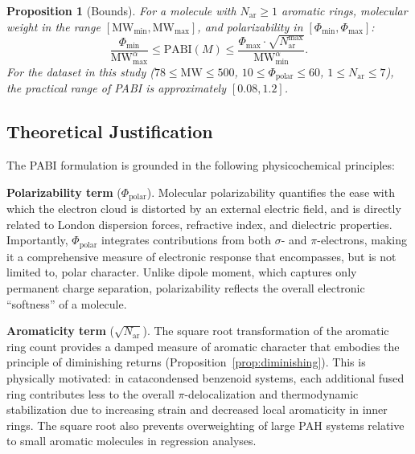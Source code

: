 \documentclass[12pt,a4paper]{article}
\newtheorem{proposition}{Proposition}
\begin{document}
\begin{proposition}[Bounds]
\label{prop:bounds}
For a molecule with $N_{\text{ar}} \geq 1$ aromatic rings, molecular weight in the range $[\text{MW}_{\min}, \text{MW}_{\max}]$, and polarizability in $[\Phi_{\min}, \Phi_{\max}]$:
\begin{equation}
\frac{\Phi_{\min}}{\text{MW}_{\max}^{\alpha}} \leq \text{PABI}(M) \leq \frac{\Phi_{\max} \cdot \sqrt{N_{\text{ar}}^{\max}}}{\text{MW}_{\min}^{\alpha}}.
\end{equation}
For the dataset in this study ($78 \leq \text{MW} \leq 500$, $10 \leq \Phi_{\text{polar}} \leq 60$, $1 \leq N_{\text{ar}} \leq 7$), the practical range of PABI is approximately $[0.08, 1.2]$.
\end{proposition}

\subsection{Theoretical Justification}

The PABI formulation is grounded in the following physicochemical principles:

\textbf{Polarizability term} ($\Phi_{\text{polar}}$). Molecular polarizability quantifies the ease with which the electron cloud is distorted by an external electric field, and is directly related to London dispersion forces, refractive index, and dielectric properties\cite{miller2007molecular}. Importantly, $\Phi_{\text{polar}}$ integrates contributions from both $\sigma$- and $\pi$-electrons, making it a comprehensive measure of electronic response that encompasses, but is not limited to, polar character. Unlike dipole moment, which captures only permanent charge separation, polarizability reflects the overall electronic ``softness'' of a molecule\cite{leach2007introduction}.

\textbf{Aromaticity term} ($\sqrt{N_{\text{ar}}}$). The square root transformation of the aromatic ring count provides a damped measure of aromatic character that embodies the principle of diminishing returns (Proposition~\ref{prop:diminishing}). This is physically motivated: in catacondensed benzenoid systems, each additional fused ring contributes less to the overall $\pi$-delocalization and thermodynamic stabilization due to increasing strain and decreased local aromaticity in inner rings\cite{randic2003aromaticity}. The square root also prevents overweighting of large PAH systems relative to small aromatic molecules in regression analyses.
\end{document}
